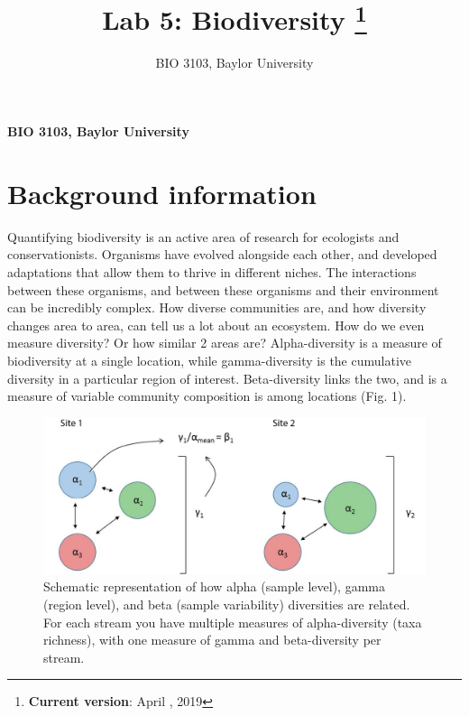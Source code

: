 \documentclass[11pt,]{article}
\title{Lab 5: Biodiversity \thanks{\textbf{Current version}: April , 2019}  }
\author{\Large BIO 3103, Baylor University\vspace{0.05in} \newline\normalsize\emph{}  }
\date{}
\newcommand*{\authorfont}{\fontfamily{phv}\selectfont}
\begin{document}
	
%



{%
\setlength{\parindent}{0pt}
\thispagestyle{plain}
{\fontsize{18}{20}\selectfont\raggedright 
\maketitle  %

}

{
   \vskip 13.5pt\relax \normalsize\fontsize{11}{12} 
\textbf{\authorfont BIO 3103, Baylor University} \hskip 15pt \emph{\small }   

}

}




\noindent  \section{Background information}\label{background-information}

Quantifying biodiversity is an active area of research for ecologists
and conservationists. Organisms have evolved alongside each other, and
developed adaptations that allow them to thrive in different niches. The
interactions between these organisms, and between these organisms and
their environment can be incredibly complex. How diverse communities
are, and how diversity changes area to area, can tell us a lot about an
ecosystem. How do we even measure diversity? Or how similar 2 areas are?
Alpha-diversity is a measure of biodiversity at a single location, while
gamma-diversity is the cumulative diversity in a particular region of
interest. Beta-diversity links the two, and is a measure of variable
community composition is among locations (Fig. 1).

\begin{figure}

{\centering \includegraphics[width=1\linewidth]{../_chapter_materials/partitioning} 

}

\caption{Schematic representation of how alpha (sample level), gamma (region level), and beta (sample variability) diversities are related. For each stream you have multiple measures of alpha-diversity (taxa richness), with one measure of gamma and beta-diversity per stream.}\label{fig:partition-fig}
\end{figure}
\end{document}
